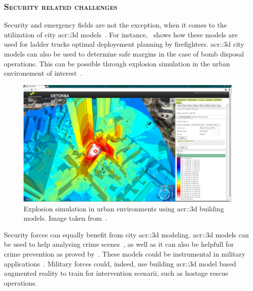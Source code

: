        \subsubsection{\textsc{Security related challenges}}
            Security and emergency fields are not the exception, when it comes to the utilization of city \gls{acr::3d} models~\parencite{kwan2005emergency, ruppel2011designing}.
            For instance,~\textcite{chen2014application} shows how these models are used for ladder trucks optimal deployement planning by firefighters.
            \gls{acr::3d} city models can also be used to determine safe margins in the case of bomb disposal operations.
            This can be possible through explosion simulation in the urban environement of interest~\parencite{willenborg2015simulation}.\\
            \begin{figure}[htpb]
                \centering
                \includegraphics[width=\textwidth]{images/introduction/3d_model_applications/explosion_simulation}            
                \caption[
                    Explosion simulation in urban environments using \acrshort*{acr::3d} building models.
                ]{
                    \label{fig::explosion_simulation}
                    Explosion simulation in urban environments using \gls{acr::3d} building models.
                    Image taken from~\parencite{ijgi4042842}.
                }
            \end{figure}
            Security forces can equally benefit from city \gls{acr::3d} modeling.
            \gls{acr::3d} models can be used to help analysing crime scenes~\parencite{wolff2009towards}, as well as it can also be helpfull for crime prevention as proved by~\textcite{wolff2008geospatial}.
            These models could be instrumental in military applications~\textcite{zlatanova2002trends, budroni2010automatic}.
            Military forces could, indeed, use building \gls{acr::3d} model based augmented reality to train for intervention scenarii, such as hostage rescue operations.

